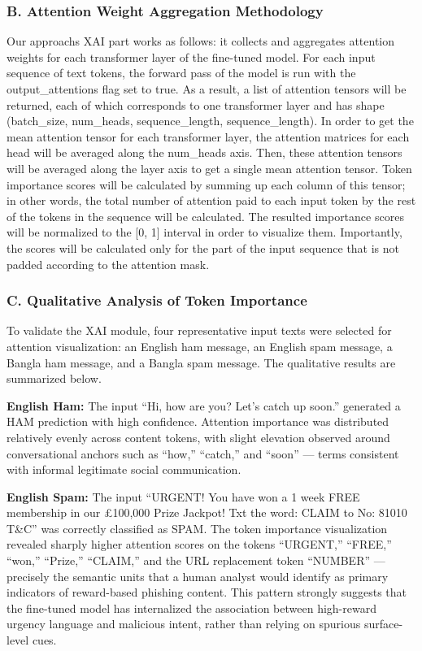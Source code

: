 \subsubsection{B. Attention Weight Aggregation
Methodology}\label{b.-attention-weight-aggregation-methodology}

Our approach\textquotesingle s XAI part works as follows: it collects
and aggregates attention weights for each transformer layer of the
fine-tuned model. For each input sequence of text tokens, the forward
pass of the model is run with the output\_attentions flag set to true.
As a result, a list of attention tensors will be returned, each of which
corresponds to one transformer layer and has shape (batch\_size,
num\_heads, sequence\_length, sequence\_length). In order to get the
mean attention tensor for each transformer layer, the attention matrices
for each head will be averaged along the num\_heads axis. Then, these
attention tensors will be averaged along the layer axis to get a single
mean attention tensor. Token importance scores will be calculated by
summing up each column of this tensor; in other words, the total number
of attention paid to each input token by the rest of the tokens in the
sequence will be calculated. The resulted importance scores will be
normalized to the {[}0, 1{]} interval in order to visualize them.
Importantly, the scores will be calculated only for the part of the
input sequence that is not padded according to the attention mask.

\subsubsection{C. Qualitative Analysis of Token
Importance}\label{c.-qualitative-analysis-of-token-importance}

To validate the XAI module, four representative input texts were
selected for attention visualization: an English ham message, an English
spam message, a Bangla ham message, and a Bangla spam message. The
qualitative results are summarized below.

\textbf{English Ham:} The input ``Hi, how are you? Let's catch up
soon.'' generated a HAM prediction with high confidence. Attention
importance was distributed relatively evenly across content tokens, with
slight elevation observed around conversational anchors such as ``how,''
``catch,'' and ``soon'' --- terms consistent with informal legitimate
social communication.

\textbf{English Spam:} The input ``URGENT! You have won a 1 week FREE
membership in our £100,000 Prize Jackpot! Txt the word: CLAIM to No:
81010 T\&C'' was correctly classified as SPAM. The token importance
visualization revealed sharply higher attention scores on the tokens
``URGENT,'' ``FREE,'' ``won,'' ``Prize,'' ``CLAIM,'' and the URL
replacement token ``NUMBER'' --- precisely the semantic units that a
human analyst would identify as primary indicators of reward-based
phishing content. This pattern strongly suggests that the fine-tuned
model has internalized the association between high-reward urgency
language and malicious intent, rather than relying on spurious
surface-level cues.

